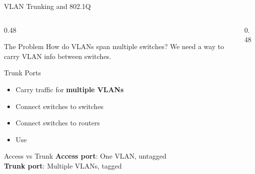 \documentclass[aspectratio=169]{beamer}  %
\begin{document}
\begin{frame}{VLAN Trunking and 802.1Q}
    \begin{columns}[T]
        \begin{column}{0.48\textwidth}
            \begin{block}{The Problem}
                \small
                How do VLANs span multiple switches? We need a way to carry VLAN info between switches.
            \end{block}
            
            \vspace{0.2em}
            \begin{block}{Trunk Ports}
                \small
                \begin{itemize}\setlength{\itemsep}{2pt}
                    \item Carry traffic for \textbf{multiple VLANs}
                    \item Connect switches to switches
                    \item Connect switches to routers
                    \item Use 
                \end{itemize}
            \end{block}
            
            \vspace{0.2em}
            \begin{alertblock}{Access vs Trunk}
                \small
                \textbf{Access port}: One VLAN, untagged \\
                \textbf{Trunk port}: Multiple VLANs, tagged
            \end{alertblock}
        \end{column}
        \begin{column}{0.48\textwidth}
            \begin{center}
\end{center}
\end{column}
\end{columns}
\end{frame}
\end{document}
